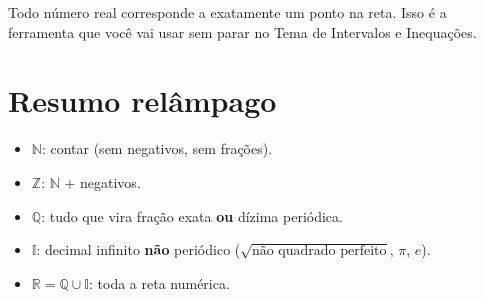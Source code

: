 \documentclass[12pt,a4paper]{article}
\begin{document}
Todo número real corresponde a exatamente um ponto na reta. Isso é a
ferramenta que você vai usar sem parar no Tema de Intervalos e Inequações.

\begin{center}
\end{center}

\section*{Resumo relâmpago}
\begin{itemize}[nosep]
  \item $\mathbb{N}$: contar (sem negativos, sem frações).
  \item $\mathbb{Z}$: $\mathbb{N}$ + negativos.
  \item $\mathbb{Q}$: tudo que vira fração exata \textbf{ou} dízima periódica.
  \item $\mathbb{I}$: decimal infinito \textbf{não} periódico ($\sqrt{\text{não quadrado perfeito}}$, $\pi$, $e$).
  \item $\mathbb{R} = \mathbb{Q}\cup\mathbb{I}$: toda a reta numérica.
\end{itemize}
\end{document}
